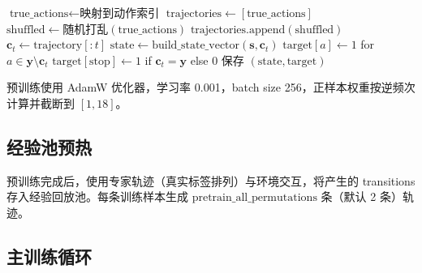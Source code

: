 \documentclass[12pt,a4paper]{article}
\newcommand{\symptoms}{\mathbf{s}}
\newcommand{\selected}{\mathbf{c}}
\newcommand{\trueSE}{\mathbf{y}}
\begin{document}
\begin{algorithm}[H]
\caption{监督预训练数据生成}
\begin{algorithmic}[1]
\For{each 训练样本 $(\symptoms, \trueSE)$}
    \State $\text{true\_actions} \gets \text{映射到动作索引}$
    \State $\text{trajectories} \gets [\text{true\_actions}]$
        \State $\text{shuffled} \gets \text{随机打乱}(\text{true\_actions})$
        \State $\text{trajectories}.\text{append}(\text{shuffled})$
    \EndFor
            \State $\selected_t \gets \text{trajectory}[:t]$
            \State $\text{state} \gets \text{build\_state\_vector}(\symptoms, \selected_t)$
            \State $\text{target}[a] \gets 1$ for $a \in \trueSE \setminus \selected_t$
            \State $\text{target}[\text{stop}] \gets 1$ if $\selected_t = \trueSE$ else 0
            \State 保存 $(\text{state}, \text{target})$
        \EndFor
    \EndFor
\EndFor
\end{algorithmic}
\end{algorithm}

预训练使用 AdamW 优化器，学习率 0.001，batch size 256，正样本权重按逆频次计算并截断到 $[1, 18]$。

\subsection{经验池预热}

预训练完成后，使用专家轨迹（真实标签排列）与环境交互，将产生的 transitions 存入经验回放池。每条训练样本生成 $\text{pretrain\_all\_permutations}$ 条（默认 2 条）轨迹。

\subsection{主训练循环}
\end{document}
